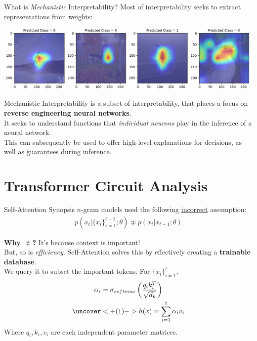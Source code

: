 \documentclass{beamer}
\begin{document}
\begin{frame}{What is \textit{Mechanistic} Interpretability?}
	Most of interpretability seeks to extract representations from weights:
	
	\begin{center}
		\includegraphics[width=\textwidth]{img/cams}
	\end{center} \pause

	Mechanistic Interpretability is a subset of interpretability, that places a focus on \textbf{reverse engineering neural networks}. \pause \newline \\

	It seeks to understand functions that \textit{individual neurons} play in the inference of a neural network. \pause \newline \\
	
	This can subsequently be used to offer high-level explanations for decisions, as well as guarantees during inference.
\end{frame}

\section{Transformer Circuit Analysis}
\begin{frame}{Self-Attention Synopsis}
	$n$-gram models used the following \underline{incorrect} assumption:
	\begin{gather}
	p(x_t | \{x_i\}^{t-1}_{i=1};\theta) \not\approx p(x_t | x_{t-1};\theta)
	\end{gather} \pause \vspace{-1.5em}

	\textbf{Why $\not\approx$?} \pause It's because context is important! \pause \newline \\

	But, so is \textit{efficiency}. Self-Attention solves this by effectively creating a \textbf{trainable database}. \pause \newline \\

	We query it to subset the important tokens. For $\{x_i\}^t_{i=1}$,
	\begin{gather}
		\alpha_i = \sigma_{softmax}\left(\frac{q_i k_i^T}{\sqrt{d_k}}\right) \\
		\uncover<+(1)->{h(x) = \sum^t_{i=1} \alpha_i v_i}
	\end{gather}
	Where $q_i, k_i, v_i$ are each independent parameter matrices.
\end{frame}
\end{document}
